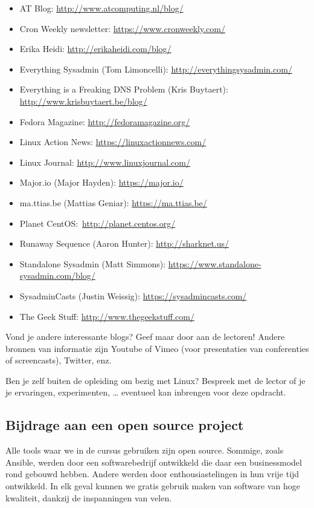\begin{itemize}
\item AT Blog: \url{http://www.atcomputing.nl/blog/}
\item Cron Weekly newsletter: \url{https://www.cronweekly.com/}
\item Erika Heidi: \url{http://erikaheidi.com/blog/}
\item Everything Sysadmin (Tom Limoncelli): \url{http://everythingsysadmin.com/}
\item Everything is a Freaking DNS Problem (Kris Buytaert): \url{http://www.krisbuytaert.be/blog/}
\item Fedora Magazine: \url{http://fedoramagazine.org/}
\item Linux Action News: \url{https://linuxactionnews.com/}
\item Linux Journal: \url{http://www.linuxjournal.com/}
\item Major.io (Major Hayden): \url{https://major.io/}
\item ma.ttias.be (Mattias Geniar): \url{https://ma.ttias.be/}
\item Planet CentOS:\ \url{http://planet.centos.org/}
\item Runaway Sequence (Aaron Hunter): \url{http://sharknet.us/}
\item Standalone Sysadmin (Matt Simmons): \url{https://www.standalone-sysadmin.com/blog/}
\item SysadminCasts (Justin Weissig): \url{https://sysadmincasts.com/}
\item The Geek Stuff: \url{http://www.thegeekstuff.com/}
\end{itemize}

Vond je andere interessante blogs? Geef maar door aan de lectoren! Andere bronnen van informatie zijn Youtube of Vimeo (voor presentaties van conferenties of screencasts), Twitter, enz.

Ben je zelf buiten de opleiding om bezig met Linux? Bespreek met de lector of je je ervaringen, experimenten, \ldots{} eventueel kan inbrengen voor deze opdracht.

\subsection{Bijdrage aan een open source project}%
\label{subs:bijdrage-aan-een-open-source-project}

Alle tools waar we in de cursus gebruiken zijn open source. Sommige, zoals Ansible, werden door een softwarebedrijf ontwikkeld die daar een businessmodel rond gebouwd hebben. Andere werden door enthousiastelingen in hun vrije tijd ontwikkeld. In elk geval kunnen we gratis gebruik maken van software van hoge kwaliteit, dankzij de inspanningen van velen.

